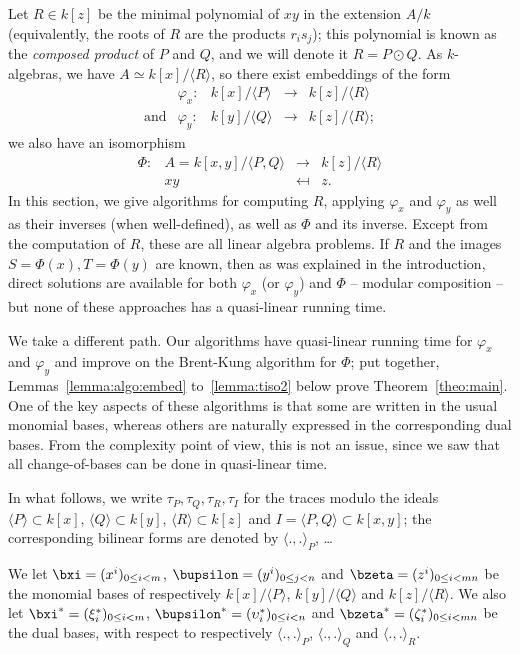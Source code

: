 \documentclass{sig-alternate}
\newcounter{algo}
\newcommand{\ang}[1]{\langle#1\rangle}
\begin{document}
Let $R \in k[z]$ be the minimal polynomial of $xy$ in the extension
$A/k$ (equivalently, the roots of $R$ are the products $r_i s_j$);
this polynomial is known as the {\em composed product} of $P$ and $Q$,
and we will denote it $R = P \odot Q$. As $k$-algebras, we have $A
\simeq k[x]/\ang{R}$, so there exist embeddings of the form
$$
\begin{array}{ccccc}
&\varphi_x: & k[x]/\ang{P} & \to & k[z]/\ang{R}\\[2mm]
\text{and} & \varphi_y: & k[y]/\langle Q \rangle & \to & k[z]/\ang{R};
\end{array}
$$
we also have an isomorphism 
$$\begin{array}{cccc} 
\Phi:&  A=k[x,y]/\langle P,Q\rangle & \to & k[z]/\ang{R} \\
&  xy & \mapsfrom & z.
\end{array}$$
In this section, we give algorithms for computing $R$, applying
$\varphi_x$ and $\varphi_y$ as well as their inverses (when
well-defined), as well as $\Phi$ and its inverse. Except from the
computation of $R$, these are all linear algebra problems. If $R$ and
the images $S=\Phi(x),T=\Phi(y)$ are known, then as was explained in
the introduction, direct solutions are available for both $\varphi_x$
(or $\varphi_y$) and $\Phi$ -- modular composition -- but none of
these approaches has a quasi-linear running time.

We take a different path. Our algorithms have quasi-linear running
time for $\varphi_x$ and $\varphi_y$ and improve on the Brent-Kung
algorithm for $\Phi$; put together, Lemmas~\ref{lemma:algo:embed}
to~\ref{lemma:tiso2} below prove Theorem~\ref{theo:main}. One of the
key aspects of these algorithms is that some are written in the usual
monomial bases, whereas others are naturally expressed in the
corresponding dual bases. From the complexity point of view, this is
not an issue, since we saw that all change-of-bases can be done in
quasi-linear time.

In what follows, we write $\tau_P,\tau_Q,\tau_R,\tau_I$ for the traces
modulo the ideals $\ang{P}\subset k[x]$, $\ang{Q} \subset k[y]$,
$\ang{R} \subset k[z]$ and $I=\ang{P,Q} \subset k[x,y]$; the
corresponding bilinear forms are denoted by $\ang{.,.}_P$, \dots

We let $\bxi=(x^i)_{0 \le i < m}$, $\bupsilon=(y^i)_{0 \le j <
  n}$ and $\bzeta = (z^i)_{0 \le i < mn}$ be the monomial bases of
respectively $k[x]/\ang{P}$, $k[y]/\ang{Q}$ and $k[z]/\ang{R}$. We also let
$\bxi^\ast=(\xi^\ast_i)_{0 \le i <m}$,
$\bupsilon^\ast=(\upsilon^\ast_i)_{0 \le i < n}$ and
$\bzeta^\ast=(\zeta^\ast_i)_{0 \le i < mn}$ be the dual bases, with
respect to respectively $\ang{.,.}_P$, $\ang{.,.}_Q$ and
$\ang{.,.}_R$.
\end{document}
